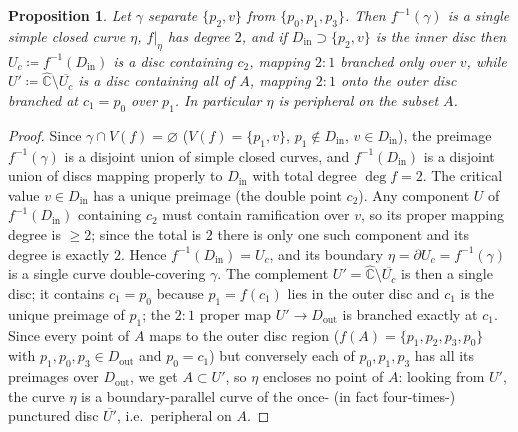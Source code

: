 \documentclass[11pt]{article}
\newtheorem{proposition}[theorem]{Proposition}
\theoremstyle{definition}
\theoremstyle{remark}
\newcommand{\Chat}{\widehat{\mathbb C}}
\begin{document}
\begin{proposition}\label{prop:preimage}
Let $\gamma$ separate $\{p_2,v\}$ from $\{p_0,p_1,p_3\}$.  Then
$f^{-1}(\gamma)$ is a single simple closed curve $\eta$, $f|_\eta$ has
degree $2$, and if $D_{\mathrm{in}}\supset\{p_2,v\}$ is the inner disc
then $U_c\coloneqq f^{-1}(D_{\mathrm{in}})$ is a disc containing
$c_2$, mapping $2:1$ branched only over $v$, while
$U'\coloneqq\Chat\setminus\overline{U_c}$ is a disc containing all of
$A$, mapping $2:1$ onto the outer disc branched at $c_1=p_0$ over
$p_1$.  In particular $\eta$ is peripheral on the subset $A$.
\end{proposition}

\begin{proof}
Since $\gamma\cap V(f)=\varnothing$ ($V(f)=\{p_1,v\}$,
$p_1\notin D_{\mathrm{in}}$, $v\in D_{\mathrm{in}}$), the preimage
$f^{-1}(\gamma)$ is a disjoint union of simple closed curves, and
$f^{-1}(D_{\mathrm{in}})$ is a disjoint union of discs mapping
properly to $D_{\mathrm{in}}$ with total degree $\deg f=2$.  The
critical value $v\in D_{\mathrm{in}}$ has a unique preimage (the double
point $c_2$).  Any component $U$ of $f^{-1}(D_{\mathrm{in}})$
containing $c_2$ must contain ramification over $v$, so its proper
mapping degree is $\ge2$; since the total is $2$ there is only one such
component and its degree is exactly $2$.  Hence
$f^{-1}(D_{\mathrm{in}})=U_c$, and its boundary
$\eta=\partial U_c=f^{-1}(\gamma)$ is a single curve double-covering
$\gamma$.  The complement $U'=\Chat\setminus\overline{U_c}$ is then a
single disc; it contains $c_1=p_0$ because $p_1=f(c_1)$ lies in the
outer disc and $c_1$ is the unique preimage of $p_1$; the $2:1$ proper
map $U'\to D_{\mathrm{out}}$ is branched exactly at $c_1$.  Since every
point of $A$ maps to the outer disc region ($f(A)=\{p_1,p_2,p_3,p_0\}$
with $p_1,p_0,p_3\in D_{\mathrm{out}}$ and $p_0=c_1$) but conversely
each of $p_0,p_1,p_3$ has all its preimages over $D_{\mathrm{out}}$,
we get $A\subset U'$, so $\eta$ encloses no point of $A$: looking from
$U'$, the curve $\eta$ is a boundary-parallel curve of the once- (in
fact four-times-) punctured disc $\overline{U'}$, i.e.\ peripheral on
$A$.
\end{proof}
\end{document}
